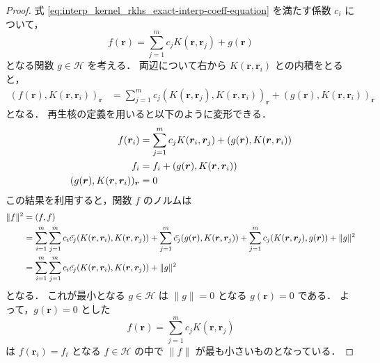 \begin{proof}
    式 \eqref{eq:interp_kernel_rkhs_exact-interp-coeff-equation} を満たす係数 $c_i$ について，
    \begin{equation}
        f(\bm{r}) = \sum_{j = 1}^{m} c_j K(\bm{r}, \bm{r}_j) + g(\bm{r})
    \end{equation}
    となる関数 $g \in \mathcal{H}$ を考える．
    両辺について右から $K(\bm{r}, \bm{r}_i)$ との内積をとると，
    \begin{align}
        (f(\bm{r}), K(\bm{r}, \bm{r}_i))_{\bm{r}} & =
        \sum_{j = 1}^{m} c_j (K(\bm{r}, \bm{r}_j), K(\bm{r}, \bm{r}_i))_{\bm{r}}
        + (g(\bm{r}), K(\bm{r}, \bm{r}_i))_{\bm{r}}
    \end{align}
    となる．
    再生核の定義を用いると以下のように変形できる．
    \begin{align}
        f(\bm{r}_i)                               & =
        \sum_{j = 1}^{m} c_j K(\bm{r}_i, \bm{r}_j) + (g(\bm{r}), K(\bm{r}, \bm{r}_i)) \notag          \\
        f_i                                       & = f_i + (g(\bm{r}), K(\bm{r}, \bm{r}_i))   \notag \\
        (g(\bm{r}), K(\bm{r}, \bm{r}_i))_{\bm{r}} & = 0
    \end{align}
    この結果を利用すると，関数 $f$ のノルムは
    \begin{align}
        \|f\|^2
         & = (f, f)
        \notag                                                                                          \\
         & = \sum_{i = 1}^{m} \sum_{j = 1}^{m} c_i \bar{c_j} (K(\bm{r}, \bm{r}_i), K(\bm{r}, \bm{r}_j))
        + \sum_{j = 1}^{m} \bar{c_j} (g(\bm{r}), K(\bm{r}, \bm{r}_j))
        + \sum_{j = 1}^{m} c_j (K(\bm{r}, \bm{r}_j), g(\bm{r}))
        + \|g\|^2
        \notag                                                                                          \\
         & = \sum_{i = 1}^{m} \sum_{j = 1}^{m} c_i \bar{c_j} (K(\bm{r}, \bm{r}_i), K(\bm{r}, \bm{r}_j))
        + \|g\|^2
    \end{align}
    となる．
    これが最小となる $g \in \mathcal{H}$ は $\|g\| = 0$ となる $g(\bm{r}) = 0$ である．
    よって，$g(\bm{r}) = 0$ とした
    \begin{equation}
        f(\bm{r}) = \sum_{j = 1}^{m} c_j K(\bm{r}, \bm{r}_j)
    \end{equation}
    は $f(\bm{r}_i) = f_i$ となる $f \in \mathcal{H}$ の中で $\|f\|$ が最も小さいものとなっている．
\end{proof}

